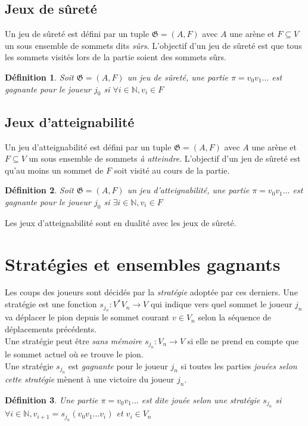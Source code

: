 \documentclass[12pt,a4paper,oneside,titlepage]{report}
\newtheorem{defi}{D\'efinition}[section]
\begin{document}
\subsection{Jeux de sûreté}
Un jeu de sûreté est défini par un tuple $\mathfrak{G}=(A,F)$ avec $A$ une arène et $F\subseteq V$ un sous ensemble de sommets dits \emph{sûrs}. L'objectif d'un jeu de sûreté est que tous les sommets visités lors de la partie soient des sommets sûrs.
\begin{defi}
Soit $\mathfrak{G}=(A,F)$ un jeu de sûreté, une partie $\pi=v_0v_1...$ est gagnante pour le joueur $j_0$ si $\forall i\in \mathbb{N}, v_i \in F$
\end{defi}
\subsection{Jeux d'atteignabilité}
Un jeu d'atteignabilité est défini par un tuple $\mathfrak{G}=(A,F)$ avec $A$ une arène et $F\subseteq V$ un sous ensemble de sommets \emph{à atteindre}. L'objectif d'un jeu de sûreté est qu'au moins un sommet de $F$ soit visité au cours de la partie. 
\begin{defi}
Soit $\mathfrak{G}=(A,F)$ un jeu d'atteignabilité, une partie $\pi=v_0v_1...$ est gagnante pour le joueur $j_0$ si $\exists i\in \mathbb{N}, v_i \in F$
\end{defi}
\noindent Les jeux d'atteignabilité sont en dualité avec les jeux de sûreté. 

\section{Stratégies et ensembles gagnants}
\noindent Les coups des joueurs sont décidés par la \emph{stratégie} adoptée par ces derniers. Une stratégie est une fonction $s_{j_n} : V^*V_n\to V$ qui indique vers quel sommet le joueur $j_n$ va déplacer le pion depuis le sommet courant $v\in V_n$ selon la séquence de déplacements précédents.\\
Une stratégie peut être \emph{sans mémoire} $s_{j_n} : V_n \to V$ si elle ne prend en compte que le sommet actuel où se trouve le pion.\\

\noindent Une stratégie $s_{j_n}$ est \emph{gagnante} pour le joueur $j_n$ si toutes les parties \emph{jouées selon cette stratégie} mènent à une victoire du joueur $j_n$.
\begin{defi}
Une partie $\pi=v_0 v_1 ...$ est dite \emph{jouée selon une stratégie} $s_{j_n}$ si $\forall i \in \mathbb{N}, v_{i+1} = s_{j_n}(v_0v_1...v_i)$ et $v_i \in V_n$
\end{defi}
\end{document}
